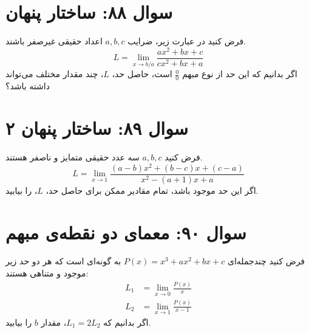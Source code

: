 \documentclass[12pt]{article}
\begin{document}
\section*{سوال ۸۸: ساختار پنهان}
فرض کنید در عبارت زیر، ضرایب \(a, b, c\) اعداد حقیقی غیرصفر باشند.
\begin{displaymath}
	L = \lim_{x \to b/a} \frac{ax^2+bx+c}{cx^2+bx+a}
\end{displaymath}
اگر بدانیم که این حد از نوع مبهم \( \frac{0}{0} \) است، حاصل حد، \(L\)، چند مقدار مختلف می‌تواند داشته باشد؟


\vspace{1cm}
\hrulefill
\vspace{1cm}

\section*{سوال ۸۹: ساختار پنهان ۲}
فرض کنید \(a, b, c\) سه عدد حقیقی متمایز و ناصفر هستند.
\begin{displaymath}
	L = \lim_{x \to 1} \frac{(a-b)x^2 + (b-c)x + (c-a)}{x^2 - (a+1)x + a}
\end{displaymath}
اگر این حد موجود باشد، تمام مقادیر ممکن برای حاصل حد، \(L\)، را بیابید.



\vspace{1cm}
\hrulefill
\vspace{1cm}


\section*{سوال ۹۰: معمای دو نقطه‌ی مبهم}
فرض کنید چندجمله‌ای \(P(x) = x^3 + ax^2 + bx + c\) به گونه‌ای است که هر دو حد زیر موجود و متناهی هستند:
\begin{align*}
	L_1 &= \lim_{x \to 0} \frac{P(x)}{x} \\
	L_2 &= \lim_{x \to 1} \frac{P(x)}{x-1}
\end{align*}
اگر بدانیم که \(L_1 = 2L_2\)، مقدار \(b\) را بیابید.
\end{document}
